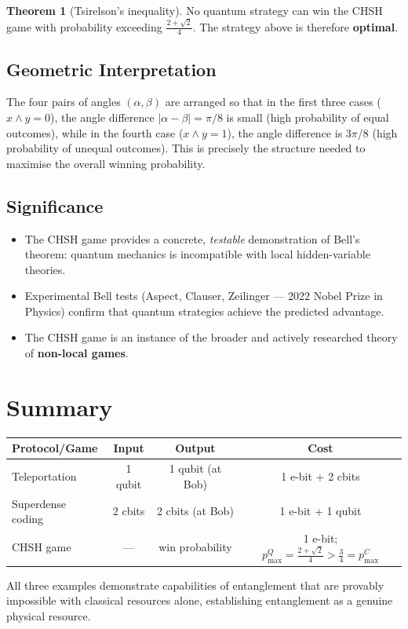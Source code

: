 \documentclass[11pt]{article}
\theoremstyle{definition}
\newtheorem{theorem}{Theorem}[section]
\begin{document}
\begin{theorem}[Tsirelson's inequality]
No quantum strategy can win the CHSH game with probability exceeding $\frac{2+\sqrt{2}}{4}$.  The strategy above is therefore \textbf{optimal}.
\end{theorem}

\subsection{Geometric Interpretation}

The four pairs of angles $(\alpha,\beta)$ are arranged so that in the first three cases ($x\wedge y=0$), the angle difference $|\alpha-\beta|=\pi/8$ is small (high probability of equal outcomes), while in the fourth case ($x\wedge y=1$), the angle difference is $3\pi/8$ (high probability of unequal outcomes).  This is precisely the structure needed to maximise the overall winning probability.

\subsection{Significance}

\begin{itemize}
    \item The CHSH game provides a concrete, \emph{testable} demonstration of Bell's theorem: quantum mechanics is incompatible with local hidden-variable theories.
    \item Experimental Bell tests (Aspect, Clauser, Zeilinger --- 2022 Nobel Prize in Physics) confirm that quantum strategies achieve the predicted advantage.
    \item The CHSH game is an instance of the broader and actively researched theory of \textbf{non-local games}.
\end{itemize}

\section{Summary}

\begin{center}
\begin{tabular}{lccc}
\hline
\textbf{Protocol/Game} & \textbf{Input} & \textbf{Output} & \textbf{Cost} \\\hline
Teleportation & 1 qubit & 1 qubit (at Bob) & 1 e-bit + 2 cbits \\
Superdense coding & 2 cbits & 2 cbits (at Bob) & 1 e-bit + 1 qubit \\
CHSH game & --- & win probability & 1 e-bit; $p_{\max}^Q=\frac{2+\sqrt{2}}{4}>\frac{3}{4}=p_{\max}^C$ \\
\hline
\end{tabular}
\end{center}

All three examples demonstrate capabilities of entanglement that are provably impossible with classical resources alone, establishing entanglement as a genuine physical resource.
\end{document}

